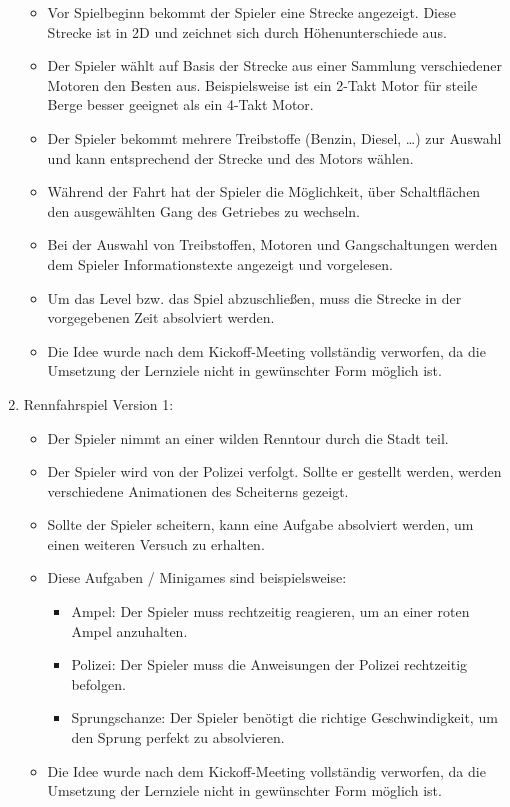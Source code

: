 \begin{enumerate}
		\begin{itemize}
			\item{Vor Spielbeginn bekommt der Spieler eine Strecke angezeigt. Diese Strecke ist in 2D und zeichnet sich durch Höhenunterschiede aus.}
			\item{Der Spieler wählt auf Basis der Strecke aus einer Sammlung verschiedener Motoren den Besten aus. Beispielsweise ist ein 2-Takt Motor für steile Berge besser geeignet als ein 4-Takt Motor.}
			\item{Der Spieler bekommt mehrere Treibstoffe (Benzin, Diesel, \dots) zur Auswahl und kann entsprechend der Strecke und des Motors wählen.}
			\item{Während der Fahrt hat der Spieler die Möglichkeit, über Schaltflächen den ausgewählten Gang des Getriebes zu wechseln.}
			\item{Bei der Auswahl von Treibstoffen, Motoren und Gangschaltungen werden dem Spieler Informationstexte angezeigt und vorgelesen.}
			\item{Um das Level bzw. das Spiel abzuschließen, muss die Strecke in der vorgegebenen Zeit absolviert werden.}
			\item{Die Idee wurde nach dem Kickoff-Meeting vollständig verworfen, da die Umsetzung der Lernziele nicht in gewünschter Form möglich ist.}
		\end{itemize}
		\item{Rennfahrspiel Version 1:}
		\begin{itemize}
			\item{Der Spieler nimmt an einer wilden Renntour durch die Stadt teil.}
			\item{Der Spieler wird von der Polizei verfolgt. Sollte er gestellt werden, werden verschiedene Animationen des Scheiterns gezeigt.}
			\item{Sollte der Spieler scheitern, kann eine Aufgabe absolviert werden, um einen weiteren Versuch zu erhalten.}
			\item{Diese Aufgaben / Minigames sind beispielsweise:}
			\begin{itemize}
				\item{Ampel: Der Spieler muss rechtzeitig reagieren, um an einer roten Ampel anzuhalten.}
				\item{Polizei: Der Spieler muss die Anweisungen der Polizei rechtzeitig befolgen.}
				\item{Sprungschanze: Der Spieler benötigt die richtige Geschwindigkeit, um den Sprung perfekt zu absolvieren.}
			\end{itemize}
			\item{Die Idee wurde nach dem Kickoff-Meeting vollständig verworfen, da die Umsetzung der Lernziele nicht in gewünschter Form möglich ist.}
		\end{itemize}
	\end{enumerate}
